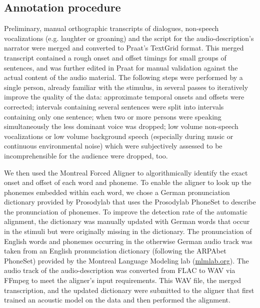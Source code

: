 \documentclass[10pt,a4paper,onecolumn]{article}
\begin{document}
\subsection*{Annotation procedure}
Preliminary, manual orthographic transcripts of dialogues, non-speech
vocalizations (e.g. laughter or groaning) and the script for the
audio-description's narrator were merged and converted to Praat's
\citep{boersma2019praat} TextGrid format.
This merged transcript contained a rough onset and offset timings for small
groups of sentences, and was further edited in Praat for manual validation
against the actual content of the audio material.
The following steps were performed by a single person, already familiar with
the stimulus, in several passes to iteratively improve the
quality of the data: approximate temporal onsets and offsets were corrected;
intervals containing several sentences were split into intervals containing only
one sentence;
when two or more persons were speaking simultaneously the less dominant voice
was dropped; low volume non-speech vocalizations or low volume background speech
(especially during music or continuous environmental noise) which were
subjectively assessed to be incomprehensible for the audience were dropped, too.

We then used the Montreal Forced Aligner \citep{mcauliffe2017montreal} to
algorithmically identify the exact onset and offset of each word and phoneme.
To enable the aligner to look up the phonemes embedded within each word, we
chose a German pronunciation dictionary provided by Prosodylab \citep
{gorman2011prosodylab} that uses the Prosodylab PhoneSet to describe the
pronunciation of phonemes.
To improve the detection rate of the automatic alignment, the dictionary was
manually updated with German words that occur in the stimuli but were originally
missing in the dictionary.
The pronunciation of English words and phonemes occurring in the otherwise
German audio track was taken from an English pronunciation dictionary (following
the ARPAbet PhoneSet) provided by the Montreal Language Modeling lab
(\href{http://mlmlab.org/mfa/dictionaries/english.dict}{mlmlab.org}).
The audio track of the audio-description was converted from FLAC to WAV via
FFmpeg \citep{ffmpeg} to meet the aligner's input requirements.
This WAV file, the merged transcription, and the updated dictionary were
submitted to the aligner that first trained an acoustic model on the data and
then performed the alignment.
\end{document}
